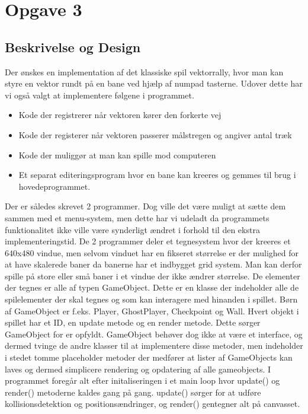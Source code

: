 \section{Opgave 3}
\subsection{Beskrivelse og Design}
Der ønskes en implementation af det klassiske spil vektorrally, hvor man kan styre en vektor rundt på en bane ved hjælp af numpad tasterne. Udover dette har vi også valgt at implementere følgene i programmet.
\begin{itemize}
\item Kode der registrerer når vektoren kører den forkerte vej
\item Kode der registerer når vektoren passerer målstregen og angiver antal træk
\item Kode der muliggør at man kan spille mod computeren
\item Et separat editeringsprogram hvor en bane kan kreeres og gemmes til brug i hovedeprogrammet.
\end{itemize}
Der er således skrevet 2 programmer. Dog ville det være muligt at sætte dem sammen med et menu-system, men dette har vi udeladt da programmets funktionalitet ikke ville være synderligt ændret i forhold til den ekstra implementeringstid. 
De 2 programmer deler et tegnesystem hvor der kreeres et 640x480 vindue, men selvom vinduet har en fikseret størrelse er der mulighed for at have skalerede baner da banerne har et indbygget grid system. Man kan derfor spille på store eller små baner i et vindue der ikke ændrer størrelse.
De elementer der tegnes er alle af typen GameObject. Dette er en klasse der indeholder alle de spilelementer der skal tegnes og som kan interagere med hinanden i spillet. Børn af GameObject er f.eks. Player, GhostPlayer, Checkpoint og Wall. Hvert objekt i spillet har et ID, en update metode og en render metode. Dette sørger GameObject for er opfyldt. GameObject behøver dog ikke at være et interface, og dermed tvinge de andre klasser til at implementere disse metoder, men indeholder i stedet tomme placeholder metoder der medfører at lister af GameObjects kan laves og dermed simplicere rendering og opdatering af alle gameobjects.
I programmet foregår alt efter initaliseringen  i et main loop hvor update() og render() metoderne kaldes gang på gang. update() sørger for at udføre kollisionsdetektion og positionsændringer, og render() gentegner alt på canvasset.
